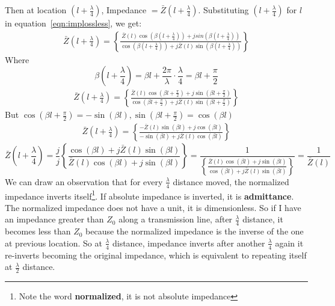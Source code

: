 Then at location ${(l+\frac{\lambda}{4})}$, Impedance  $=\bar{Z}(l+\frac{\lambda}{4})$. Substituting ${(l+\frac{\lambda}{4})}$ for $l$ in equation~\ref{eqn:implossless}, we get:
\begin{align*}
\bar{Z}\left(l+\frac{\lambda}{4}\right) = \left\lbrace \frac{\bar{Z}(l)\cos(\beta (l+\frac{\lambda}{4})) + jsin(\beta (l+\frac{\lambda}{4}))}{\cos(\beta (l+\frac{\lambda}{4})) + j\bar{Z}(l)\sin(\beta (l+\frac{\lambda}{4}))}\right\rbrace 
\end{align*}
Where 
\begin{dmath*}
\beta(l + \frac{\lambda}{4})=\beta l + \frac{2\pi}{\lambda} \cdot \frac{\lambda}{4} = \beta l + \frac{\pi}{2}
\end{dmath*}
\begin{align*} 
\bar{Z}\left(l+\frac{\lambda}{4}\right) = \left\lbrace \frac{\bar{Z}(l)\cos(\beta l + \frac{\pi}{2}) + j\sin(\beta l + \frac{\pi}{2})}{\cos(\beta l + \frac{\pi}{2}) + j\bar{Z}(l)\sin(\beta l + \frac{\pi}{2})}\right\rbrace
\end{align*}
But $\cos(\beta l + \frac{\pi}{2})= -\sin(\beta l), \sin(\beta l+\frac{\pi}{2})=\cos(\beta l)$
\begin{align*} 
\bar{Z}\left(l+\frac{\lambda}{4}\right) = \left\lbrace \frac{-\bar{Z}(l)\sin(\beta l) + j\cos(\beta l)}{-\sin(\beta l) + j\bar{Z}(l) \cos(\beta l)}\right\rbrace
\end{align*}
\begin{dmath*}
\bar{Z}\left(l+\frac{\lambda}{4}\right) =\frac{j}{j} \left\lbrace \frac{\cos(\beta l) + j\bar{Z}(l)\sin(\beta l)}{\bar{Z}(l)\cos(\beta l) + j\sin(\beta l)}\right\rbrace 
= \frac{1}{\left\lbrace \frac{\bar{Z}(l)\cos(\beta l) + j\sin(\beta l)}{\cos(\beta l) + j\bar{Z}(l)\sin(\beta l)}\right\rbrace} 
=\frac{1}{\bar{Z}(l)}
\end{dmath*}
We can draw an observation that for every $\frac{\lambda}{4}$ distance moved, the normalized impedance inverts itself\footnote{Note the word \textbf{normalized}, it is not absolute impedance}. If absolute impedance is inverted, it is \textbf{admittance}. The normalized impedance does not have a unit, it is dimensionless. So if I have an impedance greater than $Z_0$ along a transmission line, after $\frac{\lambda}{4}$ distance, it becomes less than $Z_0$ because the normalized impedance is the inverse of the one at previous location. So at $\frac{\lambda}{4}$ distance, impedance inverts after another $\frac{\lambda}{4}$ again it re-inverts becoming the original impedance, which is equivalent to repeating itself at $\frac{\lambda}{2}$ distance. 

